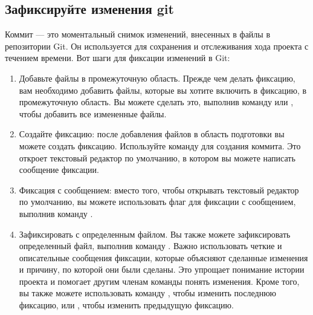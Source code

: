 \documentclass[letterpaper,10pt,russian]{sphinxmanual}
\begin{document}
\subsection{Зафиксируйте изменения git}
\label{\detokenize{educational_materials/git_base/content:id11}}
\sphinxAtStartPar
Коммит — это моментальный снимок изменений, внесенных в файлы в репозитории Git. Он используется для сохранения и отслеживания хода проекта с течением времени. Вот шаги для фиксации изменений в Git:
\begin{enumerate}
%
\item {} 
\sphinxAtStartPar
Добавьте файлы в промежуточную область. Прежде чем делать фиксацию, вам необходимо добавить файлы, которые вы хотите включить в фиксацию, в промежуточную область. Вы можете сделать это, выполнив команду  или , чтобы добавить все измененные файлы.

\item {} 
\sphinxAtStartPar
Создайте фиксацию: после добавления файлов в область подготовки вы можете создать фиксацию. Используйте команду  для создания коммита. Это откроет текстовый редактор по умолчанию, в котором вы можете написать сообщение фиксации.

\item {} 
\sphinxAtStartPar
Фиксация с сообщением: вместо того, чтобы открывать текстовый редактор по умолчанию, вы можете использовать флаг  для фиксации с сообщением, выполнив команду .

\item {} 
\sphinxAtStartPar
Зафиксировать с определенным файлом. Вы также можете зафиксировать определенный файл, выполнив команду .
Важно использовать четкие и описательные сообщения фиксации, которые объясняют сделанные изменения и причину, по которой они были сделаны. Это упрощает понимание истории проекта и помогает другим членам команды понять изменения.
Кроме того, вы также можете использовать команду , чтобы изменить последнюю фиксацию, или , чтобы изменить предыдущую фиксацию.

\end{enumerate}
\end{document}
